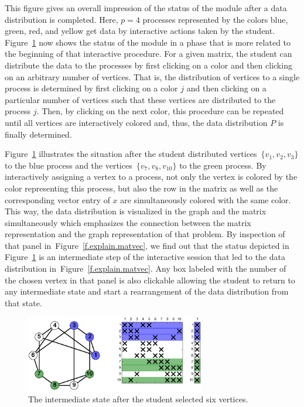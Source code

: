 \documentclass[12pt, twoside,a4paper,toc=bibliography]{scrbook}
\newcommand{\figref}[1]{Figure~\protect\ref{#1}}
\begin{document}
This figure gives an overall impression of the status of the module after a data
distribution is completed. Here, $p=4$ processes represented by the colors blue, green,
red, and yellow get data by interactive actions taken by the student.
Figure~\ref{f.beginning} now shows the status of the module in a phase that is more
related to the beginning of that interactive procedure. For a given matrix, the student
can distribute the data to the processes by first clicking on a color and then clicking
on an arbitrary number of vertices. That is, the distribution of vertices to a single
process is determined by first clicking on a color $j$ and then clicking on a particular
number of vertices such that these vertices are distributed to the process $j$.
Then, by clicking on the next color, this procedure can be repeated until
all vertices are interactively colored and, thus, the data distribution $P$ is finally
determined.

Figure~\ref{f.beginning} illustrates the situation after the student distributed
vertices~$\{ v_1, v_2, v_3 \}$ to the blue process
and the vertices~$\{ v_7, v_8, v_{10}\}$ to the green
process. By interactively assigning a vertex to a process, not only the vertex is colored
by the color representing this process, but also the row in the matrix as well as the
corresponding vector entry of $x$ are simultaneously colored with the same color.
This way, the data distribution is visualized in the graph and the matrix
simultaneously which emphasizes the connection between the matrix representation and the
graph representation of that problem. By inspection of that panel
in~\figref{f.explain.matvec}, we find out that the status depicted in \figref{f.beginning} is an
intermediate step of the interactive session that led to the data distribution
in~\figref{f.explain.matvec}. Any box labeled with the number of the chosen vertex in that panel
is also clickable allowing the student to return to any intermediate state and start a
rearrangement of the data distribution from that state.

\begin{figure}
\centering
\includegraphics[width=0.7\textwidth]{twoColors}
\caption{The intermediate state after the student selected six vertices.}
\label{f.beginning}
\end{figure}
\end{document}
